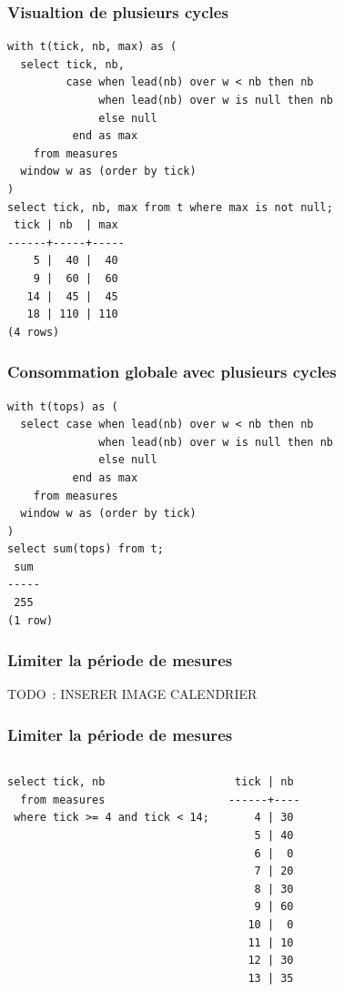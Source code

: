 \documentclass{beamer}
\begin{document}
\begin{frame}[fragile]
  \frametitle{Visualtion de plusieurs cycles}

\begin{verbatim}
with t(tick, nb, max) as (
  select tick, nb,
         case when lead(nb) over w < nb then nb
              when lead(nb) over w is null then nb
              else null
          end as max
    from measures
  window w as (order by tick)
)
select tick, nb, max from t where max is not null;
 tick | nb  | max 
------+-----+-----
    5 |  40 |  40
    9 |  60 |  60
   14 |  45 |  45
   18 | 110 | 110
(4 rows)
\end{verbatim}
\end{frame}


\begin{frame}[fragile]
  \frametitle{Consommation globale avec plusieurs cycles}

\begin{verbatim}
with t(tops) as (
  select case when lead(nb) over w < nb then nb
              when lead(nb) over w is null then nb
              else null
          end as max
    from measures
  window w as (order by tick)
)
select sum(tops) from t;
 sum 
-----
 255
(1 row)
\end{verbatim}
\end{frame}

\begin{frame}[fragile]
  \frametitle{Limiter la période de mesures}

  TODO : INSERER IMAGE CALENDRIER
\end{frame}

\begin{frame}[fragile]
  \frametitle{Limiter la période de mesures}

\begin{columns}
\begin{verbatim}
select tick, nb
  from measures
 where tick >= 4 and tick < 14;
\end{verbatim}

\begin{verbatim}
 tick | nb 
------+----
    4 | 30
    5 | 40
    6 |  0
    7 | 20
    8 | 30
    9 | 60
   10 |  0
   11 | 10
   12 | 30
   13 | 35
\end{verbatim}
\end{columns}
\end{frame}
\end{document}
